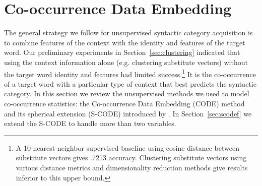 \section{Co-occurrence Data Embedding}
\label{sec:code}

The general strategy we follow for unsupervised syntactic category
acquisition is to combine features of the context with the identity
and features of the target word.  Our preliminary experiments in
Section~\ref{sec:clustering} indicated that using the context
information alone (e.g. clustering substitute vectors) without the
target word identity and features had limited success.\footnote{A
  10-nearest-neighbor supervised baseline using cosine distance
  between substitute vectors gives .7213 accuracy.  Clustering
  substitute vectors using various distance metrics and dimensionality
  reduction methods give results inferior to this upper bound.} It is
the co-occurrence of a target word with a particular type of context
that best predicts the syntactic category.  In this section we review
the unsupervised methods we used to model co-occurrence statistics:
the Co-occurrence Data Embedding (CODE) method
\cite{globerson2007euclidean} and its spherical extension (S-CODE)
introduced by \cite{maron2010sphere}.  In Section~\ref{sec:scodef} we
extend the S-CODE to handle more than two variables.

